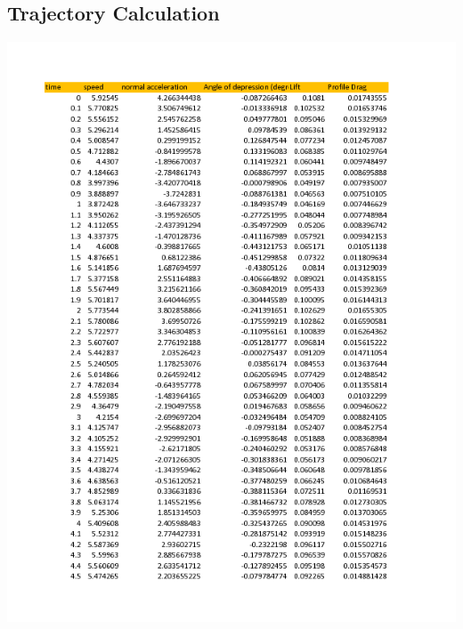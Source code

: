 \documentclass{article}
\begin{document}
\subsection{Trajectory Calculation}
\begin{minipage}{0.5\linewidth}
	\includegraphics[width = \textwidth]{glider_trajectory-0.png}
\end{minipage}
\end{document}
